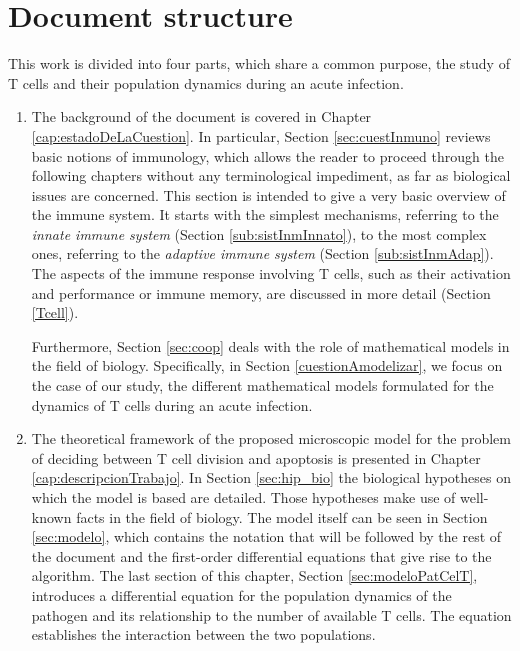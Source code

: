 \section{Document structure}

This work is divided into four parts, which share a common purpose, the study of T cells and their population dynamics during an acute infection. 

\begin{enumerate}
	\item The background of the document is covered in Chapter \ref{cap:estadoDeLaCuestion}. In particular, Section \ref{sec:cuestInmuno} reviews basic notions of immunology, which allows the reader to proceed through the following chapters without any terminological impediment, as far as biological issues are concerned. This section is intended to give a very basic overview of the immune system. It starts with the simplest mechanisms, referring to the \textit{innate immune system} (Section \ref{sub:sistInmInnato}), to the most complex ones, referring to the \textit{adaptive immune system} (Section \ref{sub:sistInmAdap}). The aspects of the immune response involving T cells, such as their activation and performance or immune memory, are discussed in more detail (Section \ref{Tcell}).
	
	Furthermore, Section \ref{sec:coop} deals with the role of mathematical models in the field of biology. Specifically, in Section \ref{cuestionAmodelizar}, we focus on the case of our study, the different mathematical models formulated for the dynamics of T cells during an acute infection. 
	
	\item The theoretical framework of the proposed microscopic model for the problem of deciding between T cell division and apoptosis is presented in Chapter \ref{cap:descripcionTrabajo}. In Section \ref{sec:hip_bio} the biological hypotheses on which the model is based are detailed. Those hypotheses make use of well-known facts in the field of biology. The model itself can be seen in Section \ref{sec:modelo}, which contains the notation that will be followed by the rest of the document and the first-order differential equations that give rise to the algorithm. The last section of this chapter, Section \ref{sec:modeloPatCelT}, introduces a differential equation for the population dynamics of the pathogen and its relationship to the number of available T cells. The equation establishes the interaction between the two populations.
		

\end{enumerate}
